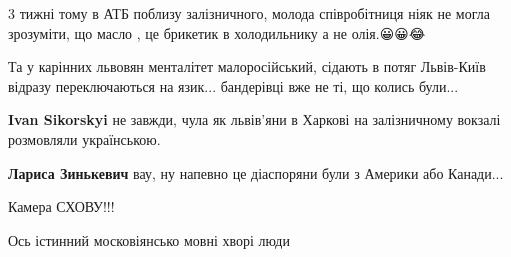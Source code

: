 \begin{itemize}
3 тижні тому в АТБ поблизу залізничного, молода співробітниця ніяк не могла
зрозуміти, що масло , це брикетик в холодильнику а не олія.😀😀😂


 

Та у карінних львовян менталітет малоросійський, сідають в потяг Львів-Київ
відразу переключаються на язик... бандерівці вже не ті, що колись були...

\begin{itemize}
 
\textbf{Ivan Sikorskyi} не завжди, чула як львів'яни в Харкові на залізничному вокзалі розмовляли українською.

 
\textbf{Лариса Зинькевич} вау, ну напевно це діаспоряни були з Америки або Канади...
\end{itemize}

 
Камера СХОВУ!!!

 
Ось істинний московіянсько мовні хворі люди

 


\end{itemize}
